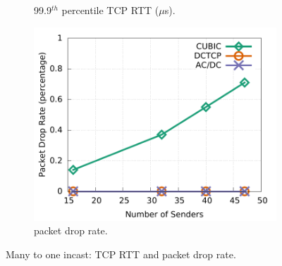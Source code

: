 \begin{figure}[t]
\begin{subfigure}[b]{0.33\textwidth}
                \caption{99.9$^{th}$ percentile TCP RTT ($\mu$s).}
                \label{incast_9k_999th_sockperf}
        \end{subfigure}
        \begin{subfigure}[b]{0.33\textwidth}
                \centering
                \includegraphics[width=\textwidth]{figures/incast/plots9k/incast_droprate_vary_sender.pdf}
                \caption{packet drop rate.}
                \label{incast_9k_droprate}
        \end{subfigure}
	\caption{Many to one incast: TCP RTT and packet drop rate.}
	\label{incast_9k_sockperf_droprate}
\end{figure}

